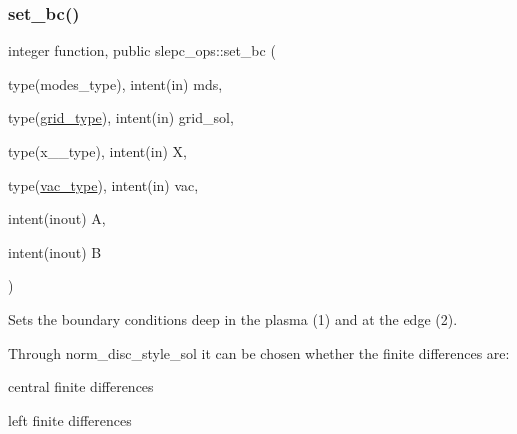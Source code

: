 \subsubsection{\texorpdfstring{set\+\_\+bc()}{set\_bc()}}
{\footnotesize\ttfamily integer function, public slepc\+\_\+ops\+::set\+\_\+bc (\begin{DoxyParamCaption}\item[{type(modes\+\_\+type), intent(in)}]{mds,  }\item[{type(\hyperlink{structgrid__vars_1_1grid__type}{grid\+\_\+type}), intent(in)}]{grid\+\_\+sol,  }\item[{type(x\+\_\+2\+\_\+type), intent(in)}]{X,  }\item[{type(\hyperlink{structvac__vars_1_1vac__type}{vac\+\_\+type}), intent(in)}]{vac,  }\item[{intent(inout)}]{A,  }\item[{intent(inout)}]{B }\end{DoxyParamCaption})}



Sets the boundary conditions deep in the plasma (1) and at the edge (2). 

Through {\ttfamily norm\+\_\+disc\+\_\+style\+\_\+sol} it can be chosen whether the finite differences are\+:
\begin{DoxyEnumerate}
\item central finite differences
\item left finite differences
\end{DoxyEnumerate}

